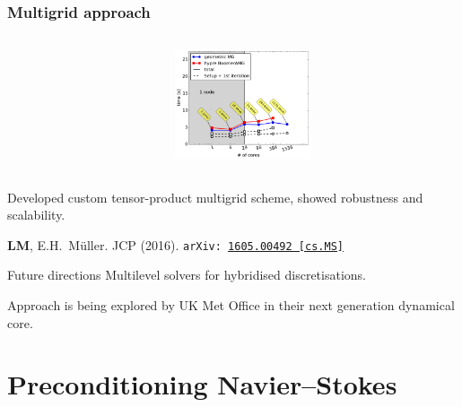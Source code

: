 \documentclass[presentation,aspectratio=43, 10pt]{beamer}
\newcommand{\arxivlink}[2]{{\texttt{arXiv:\,\href{https://arxiv.org/abs/#1}{#1\,[#2]}}}}
\begin{document}
\begin{frame}
  \frametitle{Multigrid approach}
  \begin{columns}
    \begin{column}{0.5\textwidth}
    \end{column}
    \begin{column}{0.4\textwidth}
      \includegraphics[width=4cm]{nwp-multigrid-scaling}
    \end{column}
  \end{columns}
    Developed custom tensor-product multigrid scheme, showed robustness
    and scalability.

    {\raggedleft\scriptsize\hfill \textbf{LM}, E.H.~M\"uller. JCP (2016). \arxivlink{1605.00492}{cs.MS}\nocite{Mitchell:2016}}
    \begin{block}{Future directions}
      Multilevel solvers for hybridised discretisations.

      Approach is being explored by UK Met Office in their next generation dynamical
      core.
    \end{block}
\end{frame}


\section{Preconditioning Navier--Stokes}
\end{document}
